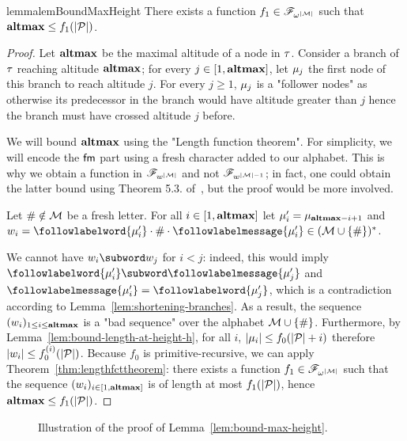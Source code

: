 
\begin{restatable}{lemma}{lemBoundMaxHeight}
	\label{lem:bound-max-height}
	There exists a function $f_1 \in \mathscr{F}_{\omega^{|\mathcal{M}|}}$ such that $\mathbf{altmax} \leq f_1(|\mathcal{P}|)$.
\end{restatable}
\begin{proof}
	Let $\mathbf{altmax}$ be the maximal altitude of a node in $\tau$. Consider a branch of $\tau$ reaching altitude $\mathbf{altmax}$; for every $j \in [1,\mathbf{altmax}]$, let $\mu_j$ the first node of this branch to reach altitude $j$. For every $j \geq 1$, $\mu_j$ is a "follower nodes" as otherwise its predecessor in the branch would have altitude greater than $j$ hence the branch must have crossed altitude $j$ before.
	
	We will bound $\mathbf{altmax}$ using the "Length function theorem". For simplicity, we will encode the $\mathsf{fm}$ part using a fresh character added to our alphabet. This is why we obtain a function in $\mathscr{F}_{w^{|\mathcal{M}|}}$ and not $\mathscr{F}_{w^{|\mathcal{M}|-1}}$; in fact, one could obtain the latter bound using Theorem 5.3. of~\cite{SchmitzS2011upperHigman}, but the proof would be more involved.

	Let $\# \notin \mathcal{M}$ be a fresh letter. For all $i \in [1,\mathbf{altmax}]$ let $\mu'_i = \mu_{\mathbf{altmax} - i+1}$ and $w_i = \followlabelword{\node'_{i}} \cdot \# \cdot \followlabelmessage{\node'_{i}} \in (\messages \cup \set{\#})^*$.
	
	We cannot have $w_{i}\subword w_{j}$ for $i< j$: indeed, this would imply $\followlabelword{\node'_{i}} \subword \followlabelmessage{\node'_{j}}$ and $\followlabelmessage{\node'_{i}} = \followlabelword{\node'_{j}}$, which is a contradiction according to Lemma~\ref{lem:shortening-branches}.
	As a result, the sequence $(w_i)_{1\leq i \leq \mathbf{altmax}}$ is a "bad sequence" over the alphabet $\mathcal{M}\cup\{\#\}$.
	Furthermore, by Lemma~\ref{lem:bound-length-at-height-h}, for all $i$, $|\mu_{i}| \leq f_0(|\mathcal{P}| + i)$ therefore $|w_i| \leq f_0^{(i)}(|\mathcal{P}|)$.
	Because $f_0$ is primitive-recursive, we can apply Theorem~\ref{thm:lengthfcttheorem}: there exists a function $f_1 \in \mathscr{F}_{\omega^{|\mathcal{M}|}}$ such that the sequence $(w_i)_{i \in [1,\mathbf{altmax}]}$ is of length at most $f_1(|\mathcal{P}|)$, hence $\mathbf{altmax} \leq f_1(|\mathcal{P}|)$. 
\end{proof}
\begin{figure}[h]
	
	\caption{Illustration of the proof of Lemma~\ref{lem:bound-max-height}.}
	\label{fig:max-height-bound}
\end{figure}

